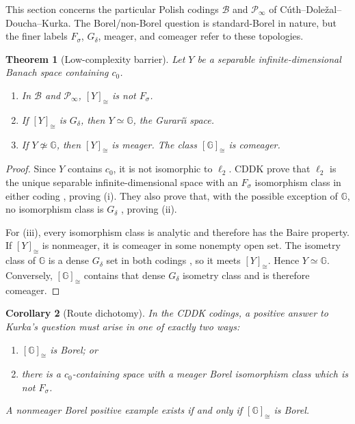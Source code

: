 \documentclass[11pt]{article}
\newtheorem{theorem}{Theorem}[section]
\newtheorem{corollary}[theorem]{Corollary}
\theoremstyle{definition}
\newcommand{\czer}{c_0}
\newcommand{\G}{\mathbb G}
\newcommand{\iso}{\simeq}
\newcommand{\class}[1]{[#1]_{\cong}}
\begin{document}
This section concerns the particular Polish codings \(\mathcal B\) and
\(\mathcal P_\infty\) of Cúth--Doležal--Doucha--Kurka.  The Borel/non-Borel
question is standard-Borel in nature, but the finer labels
\(F_\sigma\), \(G_\delta\), meager, and comeager refer to these topologies.

\begin{theorem}[Low-complexity barrier]\label{thm:CDDKbarrier}
Let \(Y\) be a separable infinite-dimensional Banach space containing
\(\czer\).
\begin{enumerate}[label=(\roman*)]
\item In \(\mathcal B\) and \(\mathcal P_\infty\), \(\class{Y}\) is not
      \(F_\sigma\).
\item If \(\class{Y}\) is \(G_\delta\), then \(Y\iso\G\), the
      Gurari\u\i{} space.
\item If \(Y\not\iso\G\), then \(\class{Y}\) is meager.  The class
      \(\class{\G}\) is comeager.
\end{enumerate}
\end{theorem}

\begin{proof}
Since \(Y\) contains \(\czer\), it is not isomorphic to \(\ell_2\).  CDDK
prove that \(\ell_2\) is the unique separable infinite-dimensional space with
an \(F_\sigma\) isomorphism class in either coding
\cite[Theorem 2.10]{CDDK}, proving (i).  They also prove that, with the
possible exception of \(\G\), no isomorphism class is \(G_\delta\)
\cite[Proposition 2.11]{CDDK}, proving (ii).

For (iii), every isomorphism class is analytic and therefore has the Baire
property.  If \(\class{Y}\) is nonmeager, it is comeager in some nonempty
open set.  The isometry class of \(\G\) is a dense \(G_\delta\) set in both
codings \cite[Theorem 1.10]{CDDK}, so it meets \(\class{Y}\).  Hence
\(Y\iso\G\).  Conversely, \(\class{\G}\) contains that dense
\(G_\delta\) isometry class and is therefore comeager.
\end{proof}

\begin{corollary}[Route dichotomy]
In the CDDK codings, a positive answer to Kurka's question must arise in one
of exactly two ways:
\begin{enumerate}[label=(\alph*)]
\item \(\class{\G}\) is Borel; or
\item there is a \(\czer\)-containing space with a meager Borel isomorphism
      class which is not \(F_\sigma\).
\end{enumerate}
A nonmeager Borel positive example exists if and only if \(\class{\G}\) is
Borel.
\end{corollary}
\end{document}
